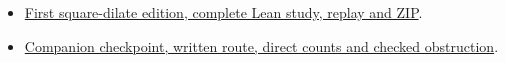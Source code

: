 \documentclass[12pt,letterpaper]{article}
\begin{document}
\begin{itemize}
\item \href{https://github.com/nousentllc/riemann-hypothesis/tree/17263859a4d27c62cfc67571737355f61a080806/research/uriel/experiments/ramified-square-dilates}{First square-dilate edition, complete Lean study, replay and ZIP}.
\item \href{https://github.com/nousentllc/riemann-hypothesis/tree/459a04431bbcc912c212b64fcc298b6a07774506/research/uriel/portfolio/ramified-companion}{Companion checkpoint, written route, direct counts and checked obstruction}.
\end{itemize}
\end{document}

